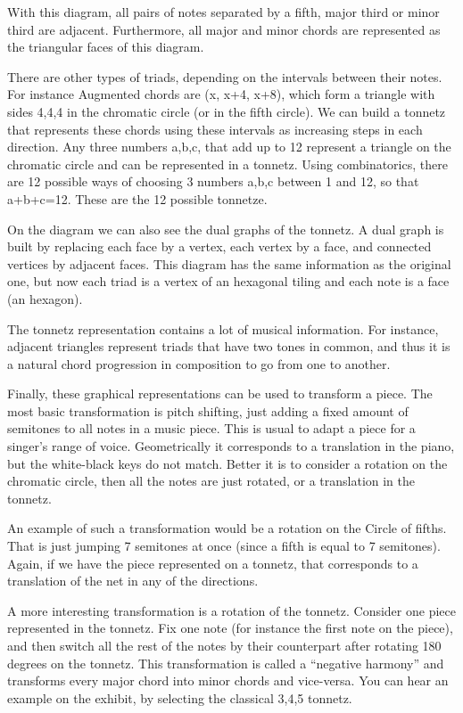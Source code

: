 With this diagram, all pairs of notes separated by a fifth, major third or minor third are adjacent. Furthermore, all major and minor chords are represented as the triangular faces of this diagram.

There are other types of triads, depending on the intervals between their notes. For instance Augmented chords are (x, x+4, x+8), which form a triangle with sides 4,4,4 in the chromatic circle (or in the fifth circle). We can build a tonnetz that represents these chords using these intervals as increasing steps in each direction. Any three numbers a,b,c, that add up to 12 represent a triangle on the chromatic circle and can be represented in a tonnetz. Using combinatorics, there are 12 possible ways of choosing 3 numbers a,b,c between 1 and 12, so that a+b+c=12. These are the 12 possible tonnetze.

On the diagram we can also see the dual graphs of the tonnetz. A dual graph is built by replacing each face by a vertex, each vertex by a face, and connected vertices by adjacent faces. This diagram has the same information as the original one, but now each triad is a vertex of an hexagonal tiling and each note is a face (an hexagon).

The tonnetz representation contains a lot of musical information. For instance, adjacent triangles represent triads that have two tones in common, and thus it is a natural chord progression in composition to go from one to another.

Finally, these graphical representations can be used to transform a piece. The most basic transformation is pitch shifting, just adding a fixed amount of semitones to all notes in a music piece. This is usual to adapt a piece for a singer's range of voice. Geometrically it corresponds to a translation in the piano, but the white-black keys do not match. Better it is to consider a rotation on the chromatic circle, then all the notes are just rotated, or a translation in the tonnetz.

An example of such a transformation would be a rotation on the Circle of fifths. That is just jumping 7 semitones at once (since a fifth is equal to 7 semitones). Again, if we have the piece represented on a tonnetz, that corresponds to a translation of the net in any of the directions.

A more interesting transformation is a rotation of the tonnetz. Consider one piece represented in the tonnetz. Fix one note (for instance the first note on the piece), and then switch all the rest of the notes by their counterpart after rotating 180 degrees on the tonnetz. This transformation is called a ``negative harmony'' and transforms every major chord into minor chords and vice-versa. You can hear an example on the exhibit, by selecting the classical 3,4,5 tonnetz.

